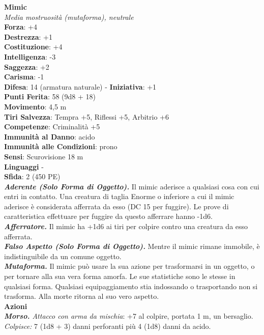 \begin{multicols}{2}
\medskip\textbf{Mimic}\\
\emph{Media mostruosità (mutaforma), neutrale}\\
\textbf{Forza}: +4\\
\textbf{Destrezza}: +1\\
\textbf{Costituzione}: +4\\
\textbf{Intelligenza}: -3\\
\textbf{Saggezza}: +2\\
\textbf{Carisma}: -1\\
\textbf{Difesa}: 14 (armatura naturale) - \textbf{Iniziativa}: +1\\
\textbf{Punti Ferita}: 58 (9d8 + 18)\\
\textbf{Movimento}: 4,5 m\\
\textbf{Tiri Salvezza}: Tempra +5, Riflessi +5, Arbitrio +6\\
\textbf{Competenze}: Criminalità +5\\
\textbf{Immunità al Danno}: acido\\
\textbf{Immunità alle Condizioni}: prono\\
\textbf{Sensi}: Scurovisione 18 m\\
\textbf{Linguaggi} -\\
\textbf{Sfida}: 2 (450 PE)\smallskip\\
\emph{\textbf{Aderente (Solo Forma di Oggetto).}} Il mimic aderisce a qualsiasi cosa con cui entri in contatto. Una creatura di taglia Enorme o inferiore a cui il mimic aderisce è considerata afferrata da esso (DC  15 per fuggire). Le prove di caratteristica effettuare per fuggire da questo afferrare hanno -1d6.\\
\emph{\textbf{Afferratore.}} Il mimic ha +1d6 ai tiri per colpire contro una creatura da esso afferrata.\\
\emph{\textbf{Falso Aspetto (Solo Forma di Oggetto).}} Mentre il mimic rimane immobile, è indistinguibile da un comune oggetto.\\
\emph{\textbf{Mutaforma.}} Il mimic può usare la sua azione per trasformarsi in un oggetto, o per tornare alla sua vera forma amorfa. Le sue statistiche sono le stesse in qualsiasi forma. Qualsiasi equipaggiamento stia indossando o trasportando non si trasforma. Alla morte ritorna al suo vero aspetto.\\
\smallskip\textbf{Azioni}\\
\emph{\textbf{Morso.} Attacco con arma da mischia}: +7 al colpire, portata 1 m, un bersaglio.\\
\emph{Colpisce:} 7 (1d8 + 3) danni perforanti più 4 (1d8) danni da acido.\\

\end{multicols}

